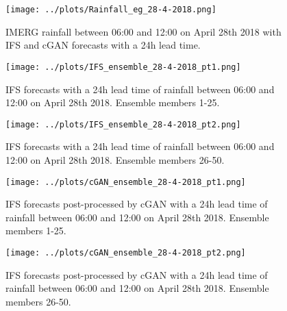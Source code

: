 \documentclass[12pt]{article}
\begin{document}

\begin{figure}
\begin{center}
\texttt{[image: ../plots/Rainfall\_eg\_28-4-2018.png]}
\end{center}
\caption{IMERG rainfall between 06:00 and 12:00 on April 28th 2018 with IFS and cGAN forecasts with a 24h lead time.}
\end{figure}

\begin{figure}
\begin{center}
\texttt{[image: ../plots/IFS\_ensemble\_28-4-2018\_pt1.png]}
\end{center}
\caption{IFS forecasts with a 24h lead time of rainfall between 06:00 and 12:00 on April 28th 2018. Ensemble members 1-25.}
\end{figure}

\begin{figure}
\begin{center}
\texttt{[image: ../plots/IFS\_ensemble\_28-4-2018\_pt2.png]}
\end{center}
\caption{IFS forecasts with a 24h lead time of rainfall between 06:00 and 12:00 on April 28th 2018. Ensemble members 26-50.}
\end{figure}

\begin{figure}
\begin{center}
\texttt{[image: ../plots/cGAN\_ensemble\_28-4-2018\_pt1.png]}
\end{center}
\caption{IFS forecasts post-processed by cGAN with a 24h lead time of rainfall between 06:00 and 12:00 on April 28th 2018. Ensemble members 1-25.}
\end{figure}

\begin{figure}
\begin{center}
\texttt{[image: ../plots/cGAN\_ensemble\_28-4-2018\_pt2.png]}
\end{center}
\caption{IFS forecasts post-processed by cGAN with a 24h lead time of rainfall between 06:00 and 12:00 on April 28th 2018. Ensemble members 26-50.}
\end{figure}
\end{document}
